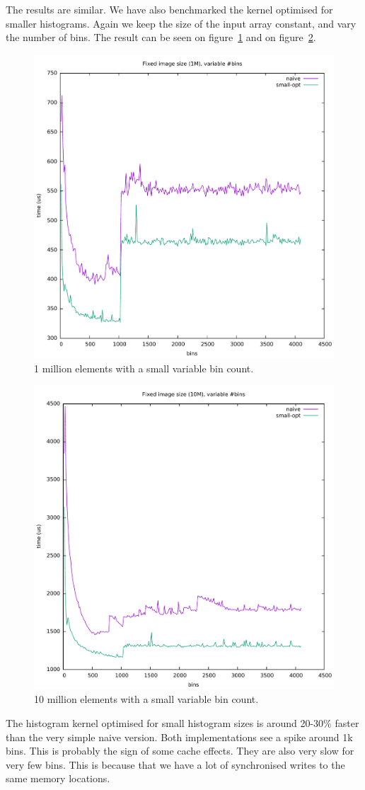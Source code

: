 \documentclass[12pt, a4paper, hidelinks]{article}
\begin{document}
The results are similar.
We have also benchmarked the kernel optimised for smaller histograms. Again we keep the size of the input array constant, and vary the number of bins. The result can be seen on figure~\ref{fig:graph3} and on figure~\ref{fig:graph4}.
\begin{figure}[htpb]
    \centering
    \includegraphics[width=0.6\linewidth]{img/graphs/1M-smallvarbins.pdf}
    \caption{1 million elements with a small variable bin count.}
    \label{fig:graph3}
\end{figure}
\begin{figure}[htpb]
    \centering
    \includegraphics[width=0.6\linewidth]{img/graphs/10M-smallvarbins.pdf}
    \caption{10 million elements with a small variable bin count.}
    \label{fig:graph4}
\end{figure}

The histogram kernel optimised for small histogram sizes is around
20-30\% faster than the very simple naive version. Both implementations see a spike
around 1k bins.
This is probably the sign of some cache effects. They are also very slow for very few bins.
This is because that we have a lot of synchronised writes to the same memory locations.
\end{document}
